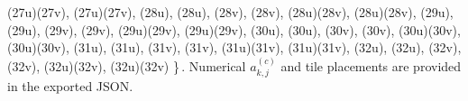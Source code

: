 \sin(27\pi u)\cos(27\pi v), \cos(27\pi u)\sin(27\pi v), \sin(28\pi u), \cos(28\pi u), \sin(28\pi v), \cos(28\pi v), \sin(28\pi u)\cos(28\pi v), \cos(28\pi u)\sin(28\pi v), \sin(29\pi u), \cos(29\pi u), \sin(29\pi v), \cos(29\pi v), \sin(29\pi u)\cos(29\pi v), \cos(29\pi u)\sin(29\pi v), \sin(30\pi u), \cos(30\pi u), \sin(30\pi v), \cos(30\pi v), \sin(30\pi u)\cos(30\pi v), \cos(30\pi u)\sin(30\pi v), \sin(31\pi u), \cos(31\pi u), \sin(31\pi v), \cos(31\pi v), \sin(31\pi u)\cos(31\pi v), \cos(31\pi u)\sin(31\pi v), \sin(32\pi u), \cos(32\pi u), \sin(32\pi v), \cos(32\pi v), \sin(32\pi u)\cos(32\pi v), \cos(32\pi u)\sin(32\pi v) \}\,.
\]
Numerical $a^{(c)}_{k,j}$ and tile placements are provided in the exported JSON.